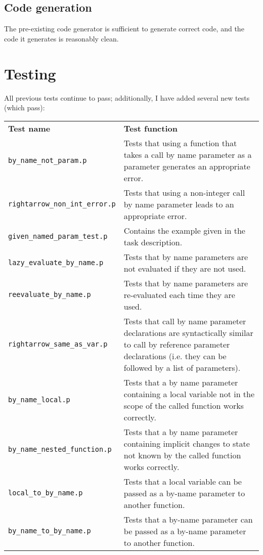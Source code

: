 \documentclass[a4paper,9pt]{article}
\begin{document}
\subsection{Code generation}
The pre-existing code generator is sufficient to generate correct code, and the code it generates is reasonably clean.
\section{Testing}

All previous tests continue to pass; additionally, I have added several new tests (which pass): \\
\begin{tabularx}{\linewidth}{ |X|X| }
\hline
    \textbf{Test name} & \textbf{Test function} \\
\hhline{|=|=|}
    \texttt{by\_name\_not\_param.p} & Tests that using a function that takes a call by name parameter as a parameter generates an appropriate error. \\
\hline
    \texttt{rightarrow\_non\_int\_error.p} & Tests that using a non-integer call by name parameter leads to an appropriate error. \\
\hline
    \texttt{given\_named\_param\_test.p} & Contains the example given in the task description. \\
\hline
    \texttt{lazy\_evaluate\_by\_name.p} & Tests that by name parameters are not evaluated if they are not used. \\
\hline
    \texttt{reevaluate\_by\_name.p} & Tests that by name parameters are re-evaluated each time they are used. \\
\hline
    \texttt{rightarrow\_same\_as\_var.p} & Tests that call by name parameter declarations are syntactically similar to call by reference parameter declarations (i.e. they can be followed by a list of parameters). \\
\hline
    \texttt{by\_name\_local.p} & Tests that a by name parameter containing a local variable not in the scope of the called function works correctly. \\
\hline
    \texttt{by\_name\_nested\_function.p} & Tests that a by name parameter containing implicit changes to state not known by the called function works correctly. \\
\hline
    \texttt{local\_to\_by\_name.p} & Tests that a local variable can be passed as a by-name parameter to another function. \\
\hline
    \texttt{by\_name\_to\_by\_name.p} & Tests that a by-name parameter can be passed as a by-name parameter to another function. \\

\end{tabularx}
\end{document}
